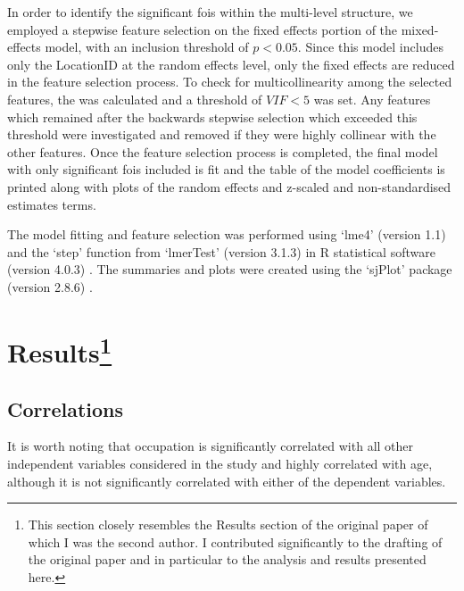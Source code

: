 In order to identify the significant \glspl{foi} within the multi-level structure, we employed a stepwise feature selection on the fixed effects portion of the mixed-effects model, with an inclusion threshold of $p < 0.05$. Since this model includes only the LocationID at the random effects level, only the fixed effects are reduced in the feature selection process. To check for multicollinearity among the selected features, the  was calculated and a threshold of $VIF < 5$ was set. Any features which remained after the backwards stepwise selection which exceeded this threshold were investigated and removed if they were highly collinear with the other features. Once the feature selection process is completed, the final model with only significant \glspl{foi} included is fit and the table of the model coefficients is printed along with plots of the random effects and z-scaled and non-standardised estimates terms. 

The model fitting and feature selection was performed using `lme4' (version 1.1) and the `step' function from `lmerTest' (version 3.1.3) \citep{Kuznetsova2017lmerTest} in R statistical software (version 4.0.3) \citep{RCT2018R}. The summaries and plots were created using the `sjPlot' package (version 2.8.6) \citep{Luedecke2021sjPlot}.

\section[Results]{Results\footnote{This section closely resembles the Results section of the original paper \citep{Erfanian2021Psychological} of which I was the second author. I contributed significantly to the drafting of the original paper and in particular to the analysis and results presented here.}}


\subsection{Correlations}

 It is worth noting that occupation is significantly correlated with all other independent variables considered in the study and highly correlated with age, although it is not significantly correlated with either of the dependent variables.  

